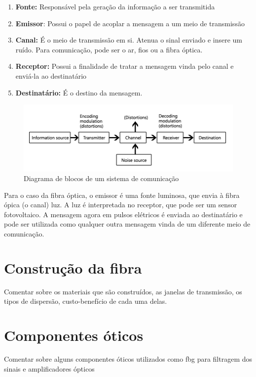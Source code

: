 \documentclass[article]{IEEEtran}
\begin{document}
\begin{enumerate}
\item \textbf{Fonte:} Responsável pela geração da informação a ser transmitida
\item \textbf{Emissor}: Possui o papel de acoplar a mensagem a um meio de transmissão
\item \textbf{Canal:} É o meio de transmissão em si. Atenua o sinal enviado e insere um ruído. Para comunicação, pode ser o ar, fios ou a fibra óptica.
\item \textbf{Receptor:} Possui a finalidade de tratar a mensagem vinda pelo canal e enviá-la ao destinatário
\item \textbf{Destinatário:} É o destino da mensagem.
\end{enumerate}

\begin{figure}[h]
\label{fig:diagrama-sistema-comunicacao}
\includegraphics[width=\columnwidth]{communication-system.jpg}
\caption{Diagrama de blocos de um sistema de comunicação}
\end{figure}

Para o caso da fibra óptica, o emissor é uma fonte luminosa, que envia à fibra ópica (o canal) luz. A luz é interpretada no receptor, que pode ser um sensor fotovoltaico. A mensagem agora em pulsos elétricos é enviada ao destinatário e pode ser utilizada como qualquer outra mensagem vinda de um diferente meio de comunicação.
\section{Construção da fibra}
Comentar sobre os materiais que são construídos, as janelas de transmissão, os tipos de dispersão, custo-benefício de cada uma delas.

\section{Componentes óticos}
Comentar sobre alguns componentes óticos utilizados como fbg para filtragem dos sinais e amplificadores ópticos
\end{document}
